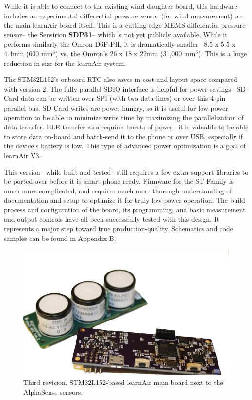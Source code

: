 While it is able to connect to the existing wind daughter board, this hardware includes an experimental differential pressure sensor (for wind measurement) on the main learnAir board itself.  This is a cutting edge MEMS differential pressure sensor-- the Sensirion \textbf{SDP31}-- which is not yet publicly available.  While it performs similarly the Omron D6F-PH, it is dramatically smaller-- 8.5 x 5.5 x 4.4mm (600 mm$^3$) vs. the Omron's 26 x 18 x 22mm (31,000 mm$^3$).  This is a huge reduction in size for the learnAir system.

The STM32L152's onboard RTC also saves in cost and layout space compared with version 2.  The fully parallel SDIO interface is helpful for power savings-- SD Card data can be written over SPI (with two data lines) or over this 4-pin parallel bus.  SD Card writes are power hungry, so it is useful for low-power operation to be able to minimize write time by maximizing the parallelization of data transfer.  BLE transfer also requires bursts of power-- it is valuable to be able to store data on-board and batch-send it to the phone or over USB, especially if the device's battery is low.  This type of advanced power optimization is a goal of learnAir V3.

This version-- while built and tested-- still requires a few extra support libraries to be ported over before it is smart-phone ready.  Firmware for the ST Family is much more complicated, and requires much more thorough understanding of documentation and setup to optimize it for truly low-power operation.  The build process and configuration of the board, its programming, and basic measurement and output controls have all been successfully tested with this design.  It represents a major step toward true production-quality.  Schematics and code samples can be found in Appendix B.

\begin{figure}
 	\includegraphics[width=\textwidth]{visuals/learnairV3} \centering              
 	 \caption{Third revision, STM32L152-based learnAir main board next to the AlphaSense sensors.}
  	\label{fig:learnairV3}
\end{figure}

